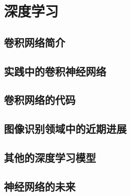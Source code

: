 
\chapter{深度学习}
\label{ch:Deeplearning}

\section{卷积网络简介}

\section{实践中的卷积神经网络}

\section{卷积网络的代码}

\section{图像识别领域中的近期进展}

\section{其他的深度学习模型}

\section{神经网络的未来}
